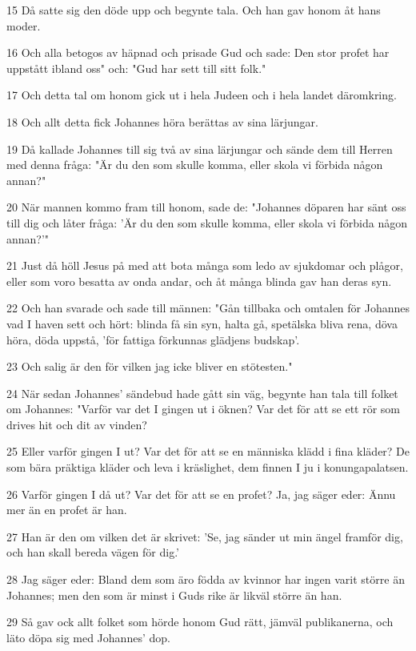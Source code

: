 \par 15 Då satte sig den döde upp och begynte tala. Och han gav honom åt hans moder.
\par 16 Och alla betogos av häpnad och prisade Gud och sade: Den stor profet har uppstått ibland oss" och: "Gud har sett till sitt folk."
\par 17 Och detta tal om honom gick ut i hela Judeen och i hela landet däromkring.
\par 18 Och allt detta fick Johannes höra berättas av sina lärjungar.
\par 19 Då kallade Johannes till sig två av sina lärjungar och sände dem till Herren med denna fråga: "Är du den som skulle komma, eller skola vi förbida någon annan?"
\par 20 När mannen kommo fram till honom, sade de: "Johannes döparen har sänt oss till dig och låter fråga: 'Är du den som skulle komma, eller skola vi förbida någon annan?'"
\par 21 Just då höll Jesus på med att bota många som ledo av sjukdomar och plågor, eller som voro besatta av onda andar, och åt många blinda gav han deras syn.
\par 22 Och han svarade och sade till männen: "Gån tillbaka och omtalen för Johannes vad I haven sett och hört: blinda få sin syn, halta gå, spetälska bliva rena, döva höra, döda uppstå, 'för fattiga förkunnas glädjens budskap'.
\par 23 Och salig är den för vilken jag icke bliver en stötesten."
\par 24 När sedan Johannes' sändebud hade gått sin väg, begynte han tala till folket om Johannes: "Varför var det I gingen ut i öknen? Var det för att se ett rör som drives hit och dit av vinden?
\par 25 Eller varför gingen I ut? Var det för att se en människa klädd i fina kläder? De som bära präktiga kläder och leva i kräslighet, dem finnen I ju i konungapalatsen.
\par 26 Varför gingen I då ut? Var det för att se en profet? Ja, jag säger eder: Ännu mer än en profet är han.
\par 27 Han är den om vilken det är skrivet: 'Se, jag sänder ut min ängel framför dig, och han skall bereda vägen för dig.'
\par 28 Jag säger eder: Bland dem som äro födda av kvinnor har ingen varit större än Johannes; men den som är minst i Guds rike är likväl större än han.
\par 29 Så gav ock allt folket som hörde honom Gud rätt, jämväl publikanerna, och läto döpa sig med Johannes' dop.
